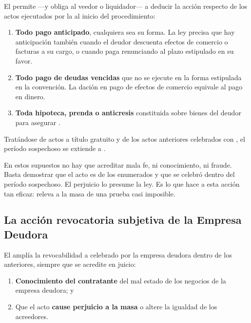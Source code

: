 El  \parencite{ley-20720} permite ---y obliga al veedor o liquidador--- a deducir
la acción respecto de los actos ejecutados por la \empresadeudora{}  al inicio del procedimiento:

\begin{enumerate}
  \item \textbf{Todo pago anticipado}, cualquiera sea su forma. La ley precisa que hay
  anticipación también cuando el deudor descuenta efectos de comercio o facturas a su cargo,
  o cuando paga renunciando al plazo estipulado en su favor.
  \item \textbf{Todo pago de deudas vencidas} que no se ejecute en la forma estipulada en la
  convención. La dación en pago de efectos de comercio equivale al pago en dinero.
  \item \textbf{Toda hipoteca, prenda o anticresis} constituida sobre bienes del deudor para
  asegurar .
\end{enumerate}

Tratándose de actos a título gratuito y de los actos anteriores celebrados con
, el período sospechoso se extiende a .

\begin{alerta}
En estos supuestos no hay que acreditar mala fe, ni conocimiento, ni fraude. Basta demostrar
que el acto es de los enumerados y que se celebró dentro del período sospechoso. El perjuicio
lo presume la ley. Es lo que hace a esta acción tan eficaz: releva a la masa de una prueba
casi imposible.
\end{alerta}

\subsection{La acción revocatoria subjetiva de la Empresa Deudora}

El  amplía la revocabilidad a  celebrado por la empresa
deudora dentro de los  anteriores, siempre que se acredite en juicio:

\begin{enumerate}
  \item \textbf{Conocimiento del contratante} del mal estado de los negocios de la empresa
  deudora; y
  \item Que el acto \textbf{cause perjuicio a la masa} o altere la igualdad de los acreedores.
\end{enumerate}

